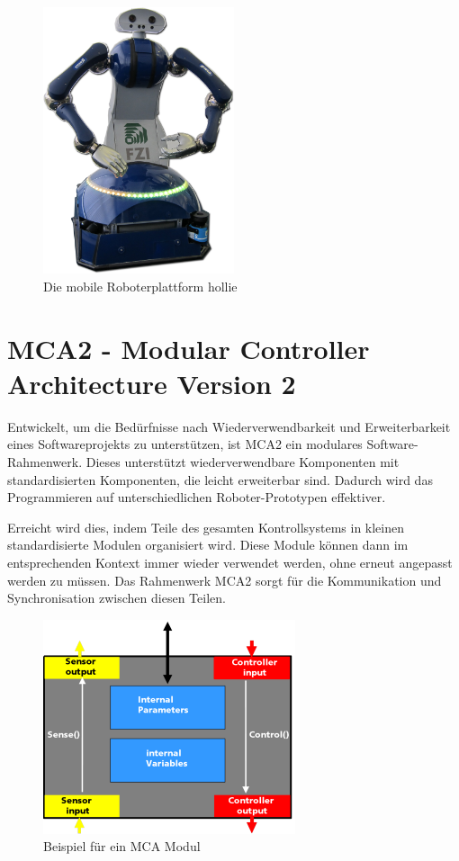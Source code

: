 \begin{figure}[h]
	\center
	\includegraphics[width=0.5\textwidth]{graphics/hollie}
	\caption{\label{fig:hollie} Die mobile Roboterplattform \gls{hollie}}
\end{figure}

\section{MCA2 - Modular Controller Architecture Version 2}
\authorsection{\editoranne}

Entwickelt, um die Bedürfnisse nach Wiederverwendbarkeit und Erweiterbarkeit eines Softwareprojekts zu unterstützen,
 ist MCA2 ein modulares Software-Rahmenwerk. Dieses unterstützt wiederverwendbare Komponenten mit standardisierten Komponenten,
 die leicht erweiterbar sind. Dadurch wird das Programmieren auf unterschiedlichen Roboter-Prototypen effektiver.

Erreicht wird dies, indem Teile des gesamten Kontrollsystems in kleinen standardisierte Modulen organisiert wird.
 Diese Module können dann im entsprechenden Kontext immer wieder verwendet werden, ohne erneut angepasst werden zu müssen.
 Das Rahmenwerk MCA2 sorgt für die Kommunikation und Synchronisation zwischen diesen Teilen.

\begin{figure}[h]
	\center
	\includegraphics[scale=2.0]{graphics/mcamodule.png}
	\caption{\label{fig:MCA-Modul} Beispiel für ein MCA Modul}
\end{figure}

